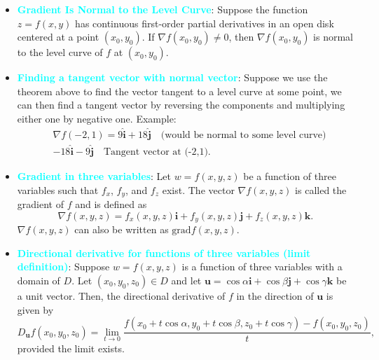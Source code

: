 \documentclass{report}
\begin{document}
\begin{itemize}
\begin{enumerate}
        \end{enumerate}
    \item \textbf{\textcolor{cyan}{Gradient Is Normal to the Level Curve}}:
        Suppose the function $z=f(x,y)$ has continuous first-order partial derivatives in an open disk centered at a point $(x_0,y_0)$. If $\nabla f(x_0,y_0) \neq 0$, then $\nabla f(x_0,y_0)$ is normal to the level curve of $f$ at $(x_0,y_0)$.
    \item \textbf{\textcolor{cyan}{Finding a tangent vector with normal vector}}: Suppose we use the theorem above to find the vector tangent to a level curve at some point, we can then find a tangent vector by reversing the components and multiplying either one by negative one.
        \bigbreak \noindent 
        Example:
        \begin{align*}
            &\nabla f(-2,1) = 9\hat{\mathbf{i}} + 18\hat{\mathbf{j}} \quad \text{(would be normal to some level curve)} \\
            &-18\hat{\mathbf{i}} -9\hat{\mathbf{j}} \quad \text{Tangent vector at (-2,1)}
        .\end{align*}
        \bigbreak \noindent 
    \item \textbf{\textcolor{cyan}{Gradient in three variables}}: 
        Let $w=f(x,y,z)$ be a function of three variables such that $f_x$, $f_y$, and $f_z$ exist. The vector $\nabla f(x,y,z)$ is called the gradient of $f$ and is defined as
        \begin{equation}
            \nabla f(x,y,z) = f_x(x,y,z)\mathbf{i} + f_y(x,y,z)\mathbf{j} + f_z(x,y,z)\mathbf{k}.
        \end{equation}
        $\nabla f(x,y,z)$ can also be written as $\text{grad}f(x,y,z)$.
        \pagebreak 
    \item \textbf{\textcolor{cyan}{Directional derivative for functions of three variables (limit definition)}}:
            Suppose $w=f(x,y,z)$ is a function of three variables with a domain of $D$. Let $(x_0,y_0,z_0) \in D$ and let $\mathbf{u}=\cos\alpha\mathbf{i}+\cos\beta\mathbf{j}+\cos\gamma\mathbf{k}$ be a unit vector. Then, the directional derivative of $f$ in the direction of $\mathbf{u}$ is given by
        \begin{equation}
        D_{\mathbf{u}}f(x_0,y_0,z_0) = \lim_{t \to 0} \frac{f(x_0 + t\cos\alpha, y_0 + t\cos\beta, z_0 + t\cos\gamma) - f(x_0,y_0,z_0)}{t},
        \end{equation}
        provided the limit exists.
        \bigbreak \noindent 

\end{itemize}
\end{document}
